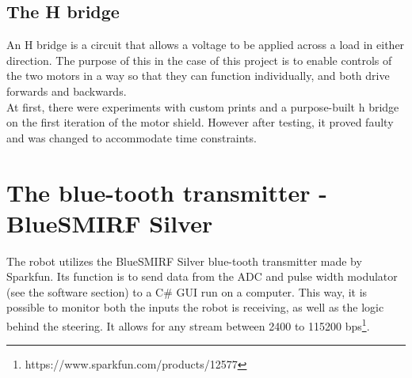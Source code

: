 \subsection{The H bridge}

An H bridge is a circuit that allows a voltage to be applied across a load in either direction. The purpose of this in the case of this project is to enable controls of the two motors in a way so that they can function individually, and both drive forwards and backwards.\\
At first, there were experiments with custom prints and a purpose-built h bridge on the first iteration of the motor shield. However after testing, it proved faulty and was changed to accommodate time constraints.

\section{The blue-tooth transmitter - BlueSMIRF Silver}

The robot utilizes the BlueSMIRF Silver blue-tooth transmitter made by Sparkfun. Its function is to send data from the ADC and pulse width modulator (see the software section) to a C\# GUI run on a computer. This way, it is possible to monitor both the inputs the robot is receiving, as well as the logic behind the steering. It allows for any stream between 2400 to 115200 bps\footnote{https://www.sparkfun.com/products/12577}. 
